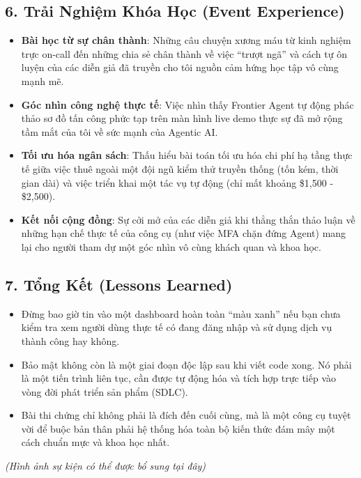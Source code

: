 \hypertarget{trux1ea3i-nghiux1ec7m-khuxf3a-hux1ecdc-event-experience}{%
\subsection{6. Trải Nghiệm Khóa Học (Event
Experience)}}

\begin{itemize}
\tightlist
\item
  \textbf{Bài học từ sự chân thành}: Những câu chuyện xương máu từ kinh
  nghiệm trực on-call đến những chia sẻ chân thành về việc ``trượt ngã''
  và cách tự ôn luyện của các diễn giả đã truyền cho tôi nguồn cảm hứng
  học tập vô cùng mạnh mẽ.
\item
  \textbf{Góc nhìn công nghệ thực tế}: Việc nhìn thấy Frontier Agent tự
  động phác thảo sơ đồ tấn công phức tạp trên màn hình live demo thực sự
  đã mở rộng tầm mắt của tôi về sức mạnh của Agentic AI.
\item
  \textbf{Tối ưu hóa ngân sách}: Thấu hiểu bài toán tối ưu hóa chi phí
  hạ tầng thực tế giữa việc thuê ngoài một đội ngũ kiểm thử truyền thống
  (tốn kém, thời gian dài) và việc triển khai một tác vụ tự động (chỉ
  mất khoảng \$1,500 - \$2,500).
\item
  \textbf{Kết nối cộng đồng}: Sự cởi mở của các diễn giả khi thẳng thắn
  thảo luận về những hạn chế thực tế của công cụ (như việc MFA chặn đứng
  Agent) mang lại cho người tham dự một góc nhìn vô cùng khách quan và
  khoa học.
\end{itemize}

\hypertarget{tux1ed5ng-kux1ebft-lessons-learned}{%
\subsection{7. Tổng Kết (Lessons
Learned)}}

\begin{itemize}
\tightlist
\item
  Đừng bao giờ tin vào một dashboard hoàn toàn ``màu xanh'' nếu bạn chưa
  kiểm tra xem người dùng thực tế có đang đăng nhập và sử dụng dịch vụ
  thành công hay không.
\item
  Bảo mật không còn là một giai đoạn độc lập sau khi viết code xong. Nó
  phải là một tiến trình liên tục, cần được tự động hóa và tích hợp trực
  tiếp vào vòng đời phát triển sản phẩm (SDLC).
\item
  Bài thi chứng chỉ không phải là đích đến cuối cùng, mà là một công cụ
  tuyệt vời để buộc bản thân phải hệ thống hóa toàn bộ kiến thức đám mây
  một cách chuẩn mực và khoa học nhất.
\end{itemize}

\emph{(Hình ảnh sự kiện có thể được bổ sung tại đây)}
